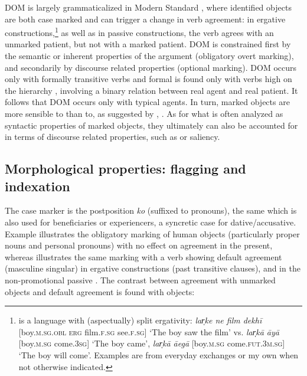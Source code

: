 \documentclass[output=paper]{LSP/langsci}
\begin{document}
DOM is largely grammaticalized in Modern Standard , where identified objects are both case marked and can trigger a change in verb agreement: in ergative constructions,\footnote{ is a language with (aspectually) split ergativity: \textit{lar̩ke ne film dekhī} [boy.\textsc{m.sg.obl erg} film.\textsc{f.sg} see.\textsc{f.sg}] ‘The boy saw the film’ vs. \textit{lar̩kā āyā} [boy.\textsc{m.sg} come.\textsc{3sg}] ‘The boy came’, \textit{lar̩kā āegā} [boy.\textsc{m.sg} come.\textsc{fut.3m.sg}] ‘The boy will come’. Examples are from everyday exchanges or my own when not otherwise indicated.} as well as in passive constructions, the verb agrees with an unmarked patient, but not with a marked patient. DOM is constrained first by the semantic or inherent properties of the argument (obligatory overt marking), and secondarily by discourse related properties (optional marking). DOM occurs only with formally transitive verbs and formal  is found only with verbs high on the  hierarchy \citep{Hopperetal1980Transitivity,Tsunoda1985Remarks}, involving a binary relation between real agent and real patient. It follows that DOM occurs only with typical agents. In turn, marked objects are more sensible to  \citep{Dalrympleetal2011Objects} than to, as suggested by \citet{Naess2004What}, . As for what is often analyzed as syntactic properties of marked objects, they ultimately can also be accounted for in terms of discourse related properties, such as  or saliency. 

\subsection{Morphological properties: flagging and indexation}
\label{10-mo-sec:2-1}

The case marker is the postposition \textit{ko} (suffixed to pronouns), the same which is also used for beneficiaries or experiencers, a syncretic case for dative/accusative. Example  illustrates the obligatory marking of human objects (particularly proper nouns and personal pronouns) with no effect on agreement in the present, whereas  illustrates the same marking with a verb showing default agreement (masculine singular) in ergative constructions (past transitive clauses), and in the non-promotional passive . 
The contrast between agreement with unmarked objects  and default agreement  is found with  objects:
\end{document}
